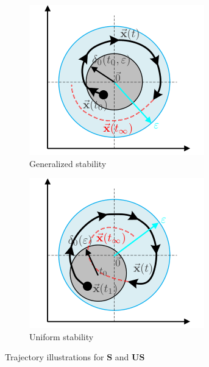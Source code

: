 \begin{figure}[hbtp]
\vspace{-6pt}
\centering
\begin{subfigure}{0.49\textwidth}
\centering
\includegraphics[width=\textwidth]{figs/basic-stability}
\vspace{-16pt}
\caption{Generalized stability}
\label{fig:basic-stability}
\end{subfigure}
\begin{subfigure}{0.49\textwidth}
\centering
\includegraphics[width=\textwidth]{figs/uniform-stability}
\vspace{-16pt}
\caption{Uniform stability}
\label{fig:uniform-stability}
\end{subfigure}
\vspace{-8pt}
\caption{Trajectory illustrations for $\mathbf{S}$ and $\mathbf{US}$}
\vspace{-18pt}
\end{figure}
